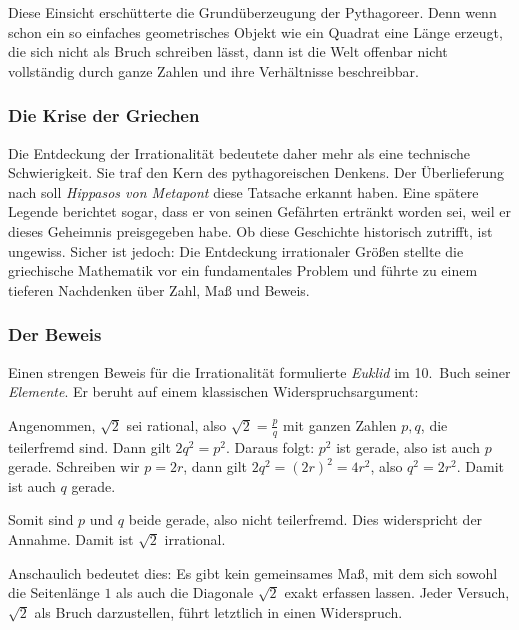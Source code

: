 Diese Einsicht erschütterte die Grundüberzeugung der Pythagoreer.
Denn wenn schon ein so einfaches geometrisches Objekt wie ein Quadrat
eine Länge erzeugt, die sich nicht als Bruch schreiben lässt,
dann ist die Welt offenbar nicht vollständig
durch ganze Zahlen und ihre Verhältnisse beschreibbar.

\subsubsection*{Die Krise der Griechen}
Die Entdeckung der Irrationalität bedeutete daher mehr
als eine technische Schwierigkeit.
Sie traf den Kern des pythagoreischen Denkens.
Der Überlieferung nach soll \emph{Hippasos von Metapont}
diese Tatsache erkannt haben.
Eine spätere Legende berichtet sogar,
dass er von seinen Gefährten ertränkt worden sei,
weil er dieses \glqq Geheimnis\grqq{} preisgegeben habe.
Ob diese Geschichte historisch zutrifft, ist ungewiss.
Sicher ist jedoch:
Die Entdeckung irrationaler Größen stellte die griechische Mathematik
vor ein fundamentales Problem
und führte zu einem tieferen Nachdenken über Zahl, Maß und Beweis.
\newpage
\noindent
\subsubsection*{Der Beweis}
Einen strengen Beweis für die Irrationalität formulierte \emph{Euklid}
im 10.~Buch seiner \emph{Elemente}.
Er beruht auf einem klassischen Widerspruchsargument:

\begin{MathBox}
	Angenommen, $\sqrt{2}$ sei rational, also $\sqrt{2}=\tfrac{p}{q}$ mit
	ganzen Zahlen $p,q$, die teilerfremd sind.
	Dann gilt $2q^2=p^2$.
	Daraus folgt:
	$p^2$ ist gerade, also ist auch $p$ gerade.
	Schreiben wir $p=2r$, dann gilt
	$2q^2=(2r)^2=4r^2$, also $q^2=2r^2$.
	Damit ist auch $q$ gerade.
	
	Somit sind $p$ und $q$ beide gerade,
	also nicht teilerfremd.
	Dies widerspricht der Annahme.
	Damit ist $\sqrt{2}$ irrational.
	\label{box:widerspruch}
\end{MathBox}

Anschaulich bedeutet dies:
Es gibt kein gemeinsames Maß,
mit dem sich sowohl die Seitenlänge $1$
als auch die Diagonale $\sqrt{2}$ exakt erfassen lassen.
Jeder Versuch, $\sqrt{2}$ als Bruch darzustellen,
führt letztlich in einen Widerspruch.

